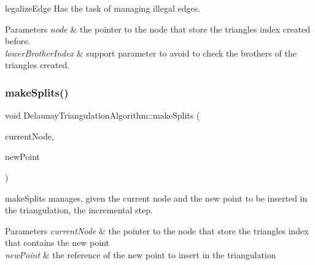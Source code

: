 legalize\+Edge Has the task of managing illegal edges. 


\begin{DoxyParams}{Parameters}
{\em node} & the pointer to the node that store the triangle\textquotesingle{}s index created before. \\
\hline
{\em lower\+Brother\+Index} & support parameter to avoid to check the brothers of the triangles created. \\
\hline
\end{DoxyParams}
\mbox{\label{classDelaunayTriangulationAlgorithm_accb8c238968145f3ce0bac23dbc4536f}} 
\subsubsection{\texorpdfstring{make\+Splits()}{makeSplits()}}
{\footnotesize\ttfamily void Delaunay\+Triangulation\+Algorithm\+::make\+Splits (\begin{DoxyParamCaption}\item[{\hyperlink{classDagNode}{Dag\+Node} $\ast$}]{current\+Node,  }\item[{const cg3\+::\+Point2\+Dd \&}]{new\+Point }\end{DoxyParamCaption})}



make\+Splits manages, given the current node and the new point to be inserted in the triangulation, the incremental step. 


\begin{DoxyParams}{Parameters}
{\em current\+Node} & the pointer to the node that store the triangle\textquotesingle{}s index that contains the new point \\
\hline
{\em new\+Point} & the reference of the new point to insert in the triangulation \\
\hline
\end{DoxyParams}
\mbox{\label{classDelaunayTriangulationAlgorithm_a694de9b5606f5ac3a7a7fa66c83a2cf2}} 
